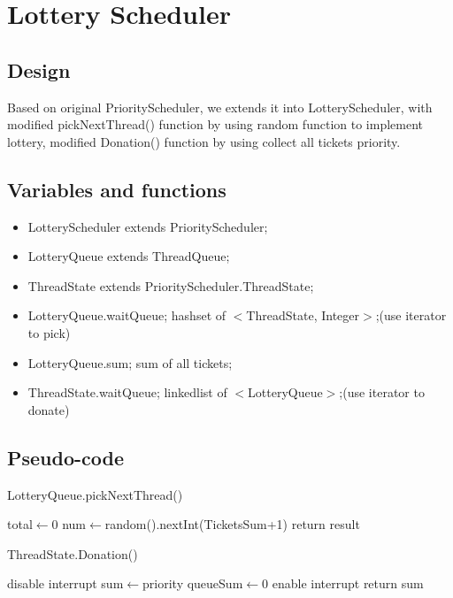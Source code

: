 \documentclass[a4paper,10pt]{article}
\begin{document}
\section{Lottery Scheduler}

\subsection{Design}
Based on original PriorityScheduler, we extends it into LotteryScheduler, with modified pickNextThread() function by using random function to implement lottery, modified Donation() function by using collect all tickets priority.
\subsection{Variables and functions}
\begin{itemize}
\item LotteryScheduler extends PriorityScheduler;
\item LotteryQueue extends ThreadQueue;
\item ThreadState extends PriorityScheduler.ThreadState;
\item LotteryQueue.waitQueue; hashset of $<$ThreadState, Integer$>$;(use iterator to pick)
\item LotteryQueue.sum; sum of all tickets;
\item ThreadState.waitQueue; linkedlist of $<$LotteryQueue$>$;(use iterator to donate)
\end{itemize}
\subsection{Pseudo-code}
%
%
\begin{algorithm}
\caption{LotteryQueue.pickNextThread()}
total$\leftarrow 0$\;
num$\leftarrow$random().nextInt(TicketsSum+1)\;
return result\;
\end{algorithm}

\begin{algorithm}
\caption{ThreadState.Donation()}
disable interrupt\;
sum$\leftarrow$priority\;
queueSum$\leftarrow 0$\;
enable interrupt\;
return sum\;
\end{algorithm}
\end{document}
